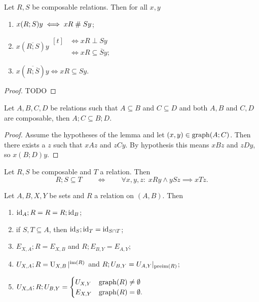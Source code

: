 \begin{lemma} \label{setOfRelationComposition}
Let $R,S$ be composable relations. Then for all $x,y$
\begin{enumerate}
\item $x(R;S)y \iff xR \mathrel{\#} Sy$;
\item $x(\overline{R;S})y \begin{aligned}[t]
&\iff xR\perp Sy \\
&\iff xR \subseteq \overline{S}y;
\end{aligned}$
\item $x(\overline{R;\overline{S}})y \iff xR \subseteq Sy$.
\end{enumerate}
\end{lemma}
\begin{proof}
TODO
\end{proof}

\begin{lemma}
Let $A,B,C,D$ be relations such that $A \subseteq B$ and $C\subseteq D$ and both $A,B$ and $C,D$ are composable, then $A;C\subseteq B;D$.
\end{lemma}
\begin{proof}
Assume the hypotheses of the lemma and let $(x,y) \in \operatorname{graph}(A;C)$. Then there exists a $z$ such that $xAz$ and $zCy$. By hypothesis this means $xBz$ and $zDy$, so $x(B;D)y$.
\end{proof}

\begin{lemma} \label{universalQuantificationForCompositionSuperset}
Let $R,S$ be composable and $T$ a relation. Then
\[ R;S \subseteq T \qquad\iff\qquad \forall x,y,z:\; xRy \land ySz \implies xTz. \]
\end{lemma}

\begin{lemma} \label{compositionCanonicalRelations}
Let $A,B,X, Y$ be sets and $R$ a relation on $(A, B)$. Then
\begin{enumerate}
\item $\operatorname{id}_A;R = R = R;\operatorname{id}_B$;
\item if $S,T\subseteq A$, then $\operatorname{id}_{S};\operatorname{id}_{T} = \operatorname{id}_{S\cap T}$;
\item $E_{X,A};R = E_{X,B}$ and $R; E_{B,Y} = E_{A,Y}$;
\item $U_{X,A};R = \operatorname{U}_{X,B}|^{\operatorname{im}(R)}$ and $R; U_{B,Y} = U_{A, Y}|_{\operatorname{preim}(R)}$;
\item $U_{X,A};R;U_{B,Y} = \begin{cases}
U_{X,Y} & \operatorname{graph}(R) \neq \emptyset \\
E_{X,Y} & \operatorname{graph}(R) = \emptyset.
\end{cases}$
\end{enumerate}
\end{lemma}

